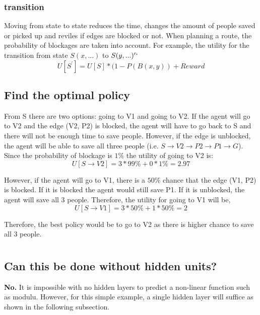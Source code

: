 \documentclass{article}                     %
\begin{document}
	\subsubsection{transition}
	Moving from state to state reduces the time, changes the amount of people saved or picked up and reviles if edges  are blocked or not. When planning a route, the probability of blockages are taken into account. For example, the utility for the transition from state $ S(x, ...) $ to $ S(y, ...)^\prime` $
	\begin{equation}\label{eq:transition}
	U[S^\prime] = U[S] * (1 -P(B(x, y))+Reward
	\end{equation} 
	
	\subsection{Find the optimal policy}
	From S there are two options: going to V1 and going to V2. If the agent will go to V2 and the edge (V2, P2) is blocked, the agent will have to go back to S and there will not be enough time to save people. However, if  the edge is unblocked, the agent will be able to save all three people (i.e. $ S\rightarrow V2\rightarrow P2\rightarrow P1\rightarrow G $).
	Since the probability of blockage is $ 1\% $ the utility of going to V2 is:
	\begin{equation}\label{uv2}
	U[S\rightarrow V2]  = 3 * 99\% + 0 * 1\% = 2.97
	\end{equation}
	
	However, if the agent will go to V1, there is a $ 50\% $ chance that the edge (V1, P2) is blocked. If it is blocked the agent would still save P1. If it is unblocked, the agent will save all 3 people. Therefore, the utility for going to V1 will be,
	\begin{equation}\label{key}
	U[S\rightarrow V1] = 3 * 50\% + 1 * 50\% = 2
	\end{equation}
	
	Therefore, the best policy would be to go to V2 as there is higher chance to save all 3 people.
	
	
	\section{}
	
	\section{}
	\subsection{Can this be done without hidden units?}
	\textbf{No.} It is impossible with no hidden layers to predict a non-linear function such as modulu. However, for this simple example, a single hidden layer will suffice as shown in the following subsection.
	
\end{document}
